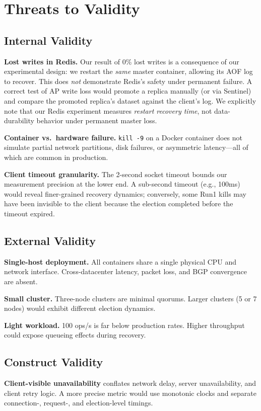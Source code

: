\documentclass[conference]{IEEEtran}
\begin{document}
\section{Threats to Validity}
\label{sec:threats}

\subsection{Internal Validity}
\textbf{Lost writes in Redis.} Our result of 0\% lost writes is a consequence of our experimental design: we restart the \textit{same} master container, allowing its AOF log to recover. This does \textit{not} demonstrate Redis's safety under permanent failure. A correct test of AP write loss would promote a replica manually (or via Sentinel) and compare the promoted replica's dataset against the client's log. We explicitly note that our Redis experiment measures \textit{restart recovery time}, not data-durability behavior under permanent master loss.

\textbf{Container vs.~hardware failure.} \texttt{kill -9} on a Docker container does not simulate partial network partitions, disk failures, or asymmetric latency---all of which are common in production.

\textbf{Client timeout granularity.} The 2-second socket timeout bounds our measurement precision at the lower end. A sub-second timeout (e.g., 100ms) would reveal finer-grained recovery dynamics; conversely, some Run1 kills may have been invisible to the client because the election completed before the timeout expired.

\subsection{External Validity}
\textbf{Single-host deployment.} All containers share a single physical CPU and network interface. Cross-datacenter latency, packet loss, and BGP convergence are absent.

\textbf{Small cluster.} Three-node clusters are minimal quorums. Larger clusters (5 or 7 nodes) would exhibit different election dynamics.

\textbf{Light workload.} 100 ops/s is far below production rates. Higher throughput could expose queueing effects during recovery.

\subsection{Construct Validity}
\textbf{Client-visible unavailability} conflates network delay, server unavailability, and client retry logic. A more precise metric would use monotonic clocks and separate connection-, request-, and election-level timings.
\end{document}
